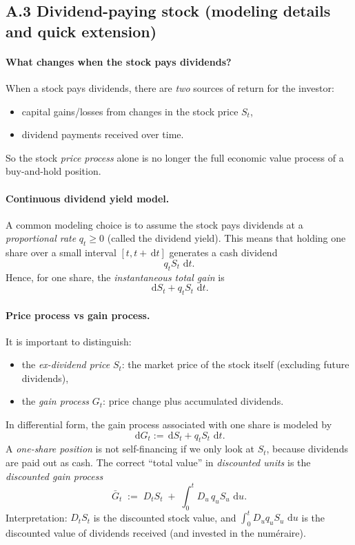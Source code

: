 \documentclass[11pt]{article}
\newcommand{\dd}{\,\mathrm{d}}
\newcommand{\1}{\mathbf{1}}
\begin{document}
\subsection*{A.3 Dividend-paying stock (modeling details and quick extension)}

\paragraph{What changes when the stock pays dividends?}
When a stock pays dividends, there are \emph{two} sources of return for the investor:
\begin{itemize}[leftmargin=1.4em]
    \item capital gains/losses from changes in the stock price \(S_t\),
    \item dividend payments received over time.
\end{itemize}
So the stock \emph{price process} alone is no longer the full economic value process of a buy-and-hold position.

\paragraph{Continuous dividend yield model.}
A common modeling choice is to assume the stock pays dividends at a \emph{proportional rate} \(q_t\ge 0\) (called the dividend yield).
This means that holding one share over a small interval \([t,t+\dd t]\) generates a cash dividend
$$
q_t S_t\,\dd t.
$$
Hence, for one share, the \emph{instantaneous total gain} is
$$
\dd S_t + q_t S_t\,\dd t.
$$

\paragraph{Price process vs gain process.}
It is important to distinguish:
\begin{itemize}[leftmargin=1.4em]
    \item the \emph{ex-dividend price} \(S_t\): the market price of the stock itself (excluding future dividends),
    \item the \emph{gain process} \(G_t\): price change plus accumulated dividends.
\end{itemize}
In differential form, the gain process associated with one share is modeled by
$$
\dd G_t := \dd S_t + q_t S_t\,\dd t.
$$
A \emph{one-share position} is not self-financing if we only look at $S_t$,
because dividends are paid out as cash.
The correct ``total value'' in \emph{discounted units} is the \emph{discounted gain process}
\[
\bar G_t
\;:=\;
D_t S_t \;+\; \int_0^t D_u\,q_u S_u\,\dd u.
\]
Interpretation: $D_t S_t$ is the discounted stock value, and
$\int_0^t D_u q_u S_u\,\dd u$ is the discounted value of dividends received (and invested in the num\'eraire).
\end{document}
